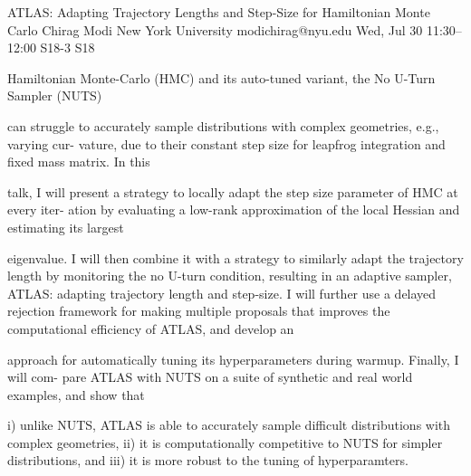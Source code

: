 \begin{talk}
  {ATLAS: Adapting Trajectory Lengths and Step-Size for Hamiltonian Monte Carlo}%
  {Chirag Modi}%
  {New York University}%
  {modichirag@nyu.edu}%
  {}%
  {}%
  {Wed, Jul 30 11:30–12:00}%
  {S18-3}%
  {S18}%
  {}%
  
				

Hamiltonian Monte-Carlo (HMC) and its auto-tuned variant, the No U-Turn Sampler (NUTS)

can struggle to accurately sample distributions with complex geometries, e.g., varying cur-
vature, due to their constant step size for leapfrog integration and fixed mass matrix. In this

talk, I will present a strategy to locally adapt the step size parameter of HMC at every iter-
ation by evaluating a low-rank approximation of the local Hessian and estimating its largest

eigenvalue. I will then combine it with a strategy to similarly adapt the trajectory length
by monitoring the no U-turn condition, resulting in an adaptive sampler, ATLAS: adapting
trajectory length and step-size. I will further use a delayed rejection framework for making
multiple proposals that improves the computational efficiency of ATLAS, and develop an

approach for automatically tuning its hyperparameters during warmup. Finally, I will com-
pare ATLAS with NUTS on a suite of synthetic and real world examples, and show that

i) unlike NUTS, ATLAS is able to accurately sample difficult distributions with complex
geometries, ii) it is computationally competitive to NUTS for simpler distributions, and iii)
it is more robust to the tuning of hyperparamters.
\medskip

\end{talk}

